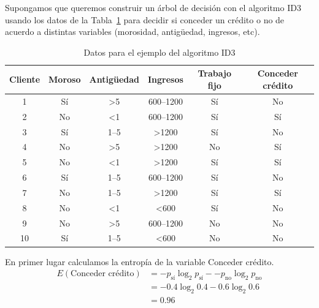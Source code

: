 \begin{ejemplo}
	Supongamos que queremos construir un árbol de decisión con el algoritmo ID3 usando los datos de la Tabla~\ref{tbl:ejemploarboldecision} para decidir si conceder un crédito o no de acuerdo a distintas variables (morosidad, antigüedad, ingresos, etc).\\
	
	\begin{table}[htbp!]
		\centering
		\caption{Datos para el ejemplo del algoritmo ID3}
		\label{tbl:ejemploarboldecision}
		\begin{tabular}{@{}cccccc@{}}
			\toprule
			Cliente & Moroso & Antigüedad    & Ingresos         & Trabajo fijo & Conceder crédito \\ \midrule
			1       & Sí     & \textgreater5 & 600--1200        & Sí           & No               \\
			2       & No     & \textless1    & 600--1200        & Sí           & Sí               \\
			3       & Sí     & 1--5          & \textgreater1200 & Sí           & No               \\
			4       & No     & \textgreater5 & \textgreater1200 & No           & Sí               \\
			5       & No     & \textless1    & \textgreater1200 & Sí           & Sí               \\
			6       & Sí     & 1--5          & 600--1200        & Sí           & No               \\
			7       & No     & 1--5          & \textgreater1200 & Sí           & Sí               \\
			8       & No     & \textless1    & \textless600     & Sí           & No               \\
			9       & No     & \textgreater5 & 600--1200        & No           & No               \\
			10      & Sí     & 1--5          & \textless600     & No           & No               \\ \bottomrule
		\end{tabular}
	\end{table}
	
	En primer lugar calculamos la entropía de la variable Conceder crédito.\\
	
	\begin{align*}
	E(\text{Conceder crédito})& = -p_\text{sí}\log_2 p_\text{sí}- -p_\text{no}\log_2 p_\text{no}\\
	                          & = -0.4\log_2 0.4 - 0.6 \log_2 0.6 \\
	                          & = 0.96
	\end{align*}
	

\end{ejemplo}
